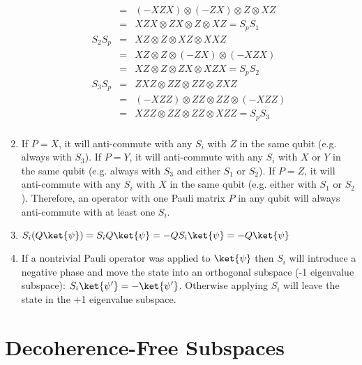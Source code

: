 \documentclass[12pt]{article}
\begin{document}
\begin{enumerate}
\begin{eqnarray*}
       & = & (-XZX)\otimes (-ZX) \otimes Z \otimes XZ\\
       & = & XZX \otimes ZX \otimes Z \otimes XZ = S_pS_1 \\
S_2S_p & = & XZ \otimes Z \otimes XZ \otimes XXZ\\
       & = & XZ \otimes Z \otimes (-ZX) \otimes (-XZX)\\
       & = & XZ \otimes Z \otimes ZX \otimes XZX = S_pS_2\\
S_3S_p & = & ZXZ \otimes ZZ \otimes ZZ \otimes ZXZ\\
       & = & (-XZZ) \otimes ZZ \otimes ZZ \otimes (-XZZ)\\
       & = & XZZ \otimes ZZ \otimes ZZ \otimes XZZ = S_pS_3\\
\end{eqnarray*}
\item %
If $P=X$, it will anti-commute with any $S_i$ with $Z$ in the same qubit
(e.g. always with $S_3$).
If $P=Y$, it will anti-commute with any $S_i$ with $X$ or $Y$ in the same qubit
(e.g. always with $S_3$ and either $S_1$ or $S_2$).
If $P=Z$, it will anti-commute with any $S_i$ with $X$ in the same qubit
(e.g. either with $S_1$ or $S_2$).
Therefore, an operator with one Pauli matrix $P$ in any qubit will always
anti-commute with at least one $S_i$.
\item %
$S_i(Q\ket{\psi}) = S_iQ\ket{\psi} = -QS_i\ket{\psi} = -Q\ket{\psi}$
\item %
If a nontrivial Pauli operator was applied to $\ket{\psi}$ then
$S_i$ will introduce a negative phase and move the state into an
orthogonal subspace (-1 eigenvalue subspace): $S_i\ket{\psi'} = -\ket{\psi'}$.
Otherwise applying $S_i$ will leave the state in the +1 eigenvalue subspace.
\end{enumerate}

\pagebreak

\section{Decoherence-Free Subspaces}
\end{document}
